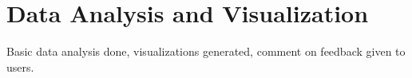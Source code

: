 \chapter{Data Analysis and Visualization} \label{chap:data-analysis-viz}
Basic data analysis done, visualizations generated, comment on feedback given to users.